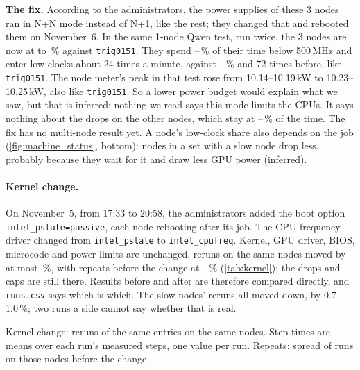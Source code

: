 \textbf{The fix.} According to the administrators, the power supplies of these 3 nodes ran in N+N mode instead of N+1, like the rest; they changed that and rebooted them on November~6. In the same 1-node Qwen test, run twice, the 3 nodes are now at \TriFixPctLo{} to \TriFixPctHi\,\% against \texttt{trig0151}. They spend \TriProbeFixTimeLo--\TriProbeFixTimeHi\,\% of their time below 500\,MHz and enter low clocks about 24 times a minute, against \TriProbeSlowTimeLo--\TriProbeSlowTimeHi\,\% and 72 times before, like \texttt{trig0151}. The node meter's peak in that test rose from 10.14--10.19\,kW to 10.23--10.25\,kW, also like \texttt{trig0151}. So a lower power budget would explain what we saw, but that is inferred: nothing we read says this mode limits the CPUs. It says nothing about the drops on the other nodes, which stay at \TriProbeTimeLo--\TriProbeTimeHi\,\% of the time. The fix has no multi-node result yet.
A node's low-clock share also depends on the job (\cref{fig:machine_status}, bottom): nodes in a set with a slow node drop less, probably because they wait for it and draw less GPU power (inferred).

\paragraph{Kernel change.} On November~5, from 17:33 to 20:58, the administrators added the boot option \texttt{intel\_pstate=passive}, each node rebooting after its job. The CPU frequency driver changed from \texttt{intel\_pstate} to \texttt{intel\_cpufreq}. Kernel, GPU driver, BIOS, microcode and
power limits are unchanged. \TriKernelReruns{} reruns on the same nodes moved by at most \TriKernelMaxChange\,\%, with repeats before the change at \TriKernelRepeatLo--\TriKernelRepeatHi\,\% (\cref{tab:kernel}); the drops and caps are still there. Results before and after are therefore compared directly, and \texttt{runs.csv} says which is which.
The slow nodes' reruns all moved down, by 0.7--1.0\,\%; two runs a side cannot say whether that is real.

\begin{table}[h]
  \caption{Kernel change: reruns of the same entries on the same nodes. Step times are means over each run's measured steps, one value per run. Repeats: spread of runs on those nodes before the change.}
  \label{tab:kernel}
  \centering\small
  \begin{adjustbox}{max width=\linewidth}
  \end{adjustbox}
\end{table}

